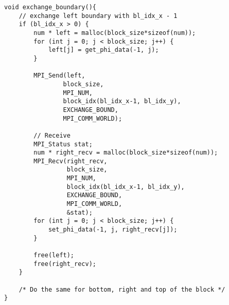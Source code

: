 \begin{lstlisting}[caption= Transfer boundary]
void exchange_boundary(){
    // exchange left boundary with bl_idx_x - 1
    if (bl_idx_x > 0) {
        num * left = malloc(block_size*sizeof(num));
        for (int j = 0; j < block_size; j++) {
            left[j] = get_phi_data(-1, j);
        }

        MPI_Send(left,
                block_size,
                MPI_NUM,
                block_idx(bl_idx_x-1, bl_idx_y),
                EXCHANGE_BOUND,
                MPI_COMM_WORLD);
        
        // Receive
        MPI_Status stat;
        num * right_recv = malloc(block_size*sizeof(num));
        MPI_Recv(right_recv, 
                 block_size, 
                 MPI_NUM, 
                 block_idx(bl_idx_x-1, bl_idx_y),
                 EXCHANGE_BOUND, 
                 MPI_COMM_WORLD, 
                 &stat);
        for (int j = 0; j < block_size; j++) {
            set_phi_data(-1, j, right_recv[j]);
        }
        
        free(left);
        free(right_recv);
    }
   
    /* Do the same for bottom, right and top of the block */
}
\end{lstlisting}